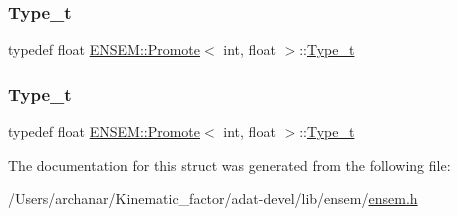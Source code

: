 \subsubsection{\texorpdfstring{Type\_t}{Type\_t}\hspace{0.1cm}{\footnotesize\ttfamily [2/3]}}
{\footnotesize\ttfamily typedef float \mbox{\hyperlink{structENSEM_1_1Promote}{E\+N\+S\+E\+M\+::\+Promote}}$<$ int, float $>$\+::\mbox{\hyperlink{structENSEM_1_1Promote_3_01int_00_01float_01_4_af9c8f66593ece7d87835891df1c0d7e4}{Type\+\_\+t}}}

\mbox{\label{structENSEM_1_1Promote_3_01int_00_01float_01_4_af9c8f66593ece7d87835891df1c0d7e4}} 
\subsubsection{\texorpdfstring{Type\_t}{Type\_t}\hspace{0.1cm}{\footnotesize\ttfamily [3/3]}}
{\footnotesize\ttfamily typedef float \mbox{\hyperlink{structENSEM_1_1Promote}{E\+N\+S\+E\+M\+::\+Promote}}$<$ int, float $>$\+::\mbox{\hyperlink{structENSEM_1_1Promote_3_01int_00_01float_01_4_af9c8f66593ece7d87835891df1c0d7e4}{Type\+\_\+t}}}



The documentation for this struct was generated from the following file\+:\begin{DoxyCompactItemize}
\item 
/\+Users/archanar/\+Kinematic\+\_\+factor/adat-\/devel/lib/ensem/\mbox{\hyperlink{adat-devel_2lib_2ensem_2ensem_8h}{ensem.\+h}}\end{DoxyCompactItemize}
